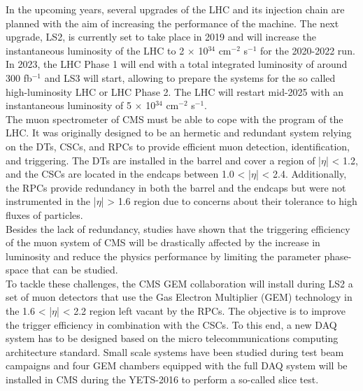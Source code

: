 In the upcoming years, several upgrades of the LHC and its injection chain are planned with the aim of increasing the performance of the machine. The next upgrade, LS2, is currently set to take place in 2019 and will increase the instantaneous luminosity of the LHC to 2 $ \times $ 10$^{34}$ cm$^{-2}$ s$^{-1}$ for the 2020-2022 run. In 2023, the LHC Phase 1 will end with a total integrated luminosity of around 300 fb$^{-1}$ and LS3 will start, allowing to prepare the systems for the so called high-luminosity LHC or LHC Phase 2. The LHC will restart mid-2025 with an instantaneous luminosity of 5 $ \times $ 10$^{34}$ cm$^{-2}$ s$^{-1}$. \\

The muon spectrometer of CMS must be able to cope with the program of the LHC. It was originally designed to be an hermetic and redundant system relying on the DTs, CSCs, and RPCs to provide efficient muon detection, identification, and triggering. The DTs are installed in the barrel and cover a region of |$\eta$| < 1.2, and the CSCs are located in the endcaps between 1.0 < |$\eta$| < 2.4. Additionally, the RPCs provide redundancy in both the barrel and the endcaps but were not instrumented in the |$\eta$| > 1.6 region due to concerns about their tolerance to high fluxes of particles. \\

Besides the lack of redundancy, studies have shown that the triggering efficiency of the muon system of CMS will be drastically affected by the increase in luminosity and reduce the physics performance by limiting the parameter phase-space that can be studied. \\

To tackle these challenges, the CMS GEM collaboration \cite{Colaleo:2021453} will install during LS2 a set of muon detectors that use the Gas Electron Multiplier (GEM) technology in the 1.6 < |$\eta$| < 2.2 region left vacant by the RPCs. The objective is to improve the trigger efficiency in combination with the CSCs. To this end, a new DAQ system has to be designed based on the micro telecommunications computing architecture standard. Small scale systems have been studied during test beam campaigns and four GEM chambers equipped with the full DAQ system will be installed in CMS during the YETS-2016 to perform a so-called slice test. \\

